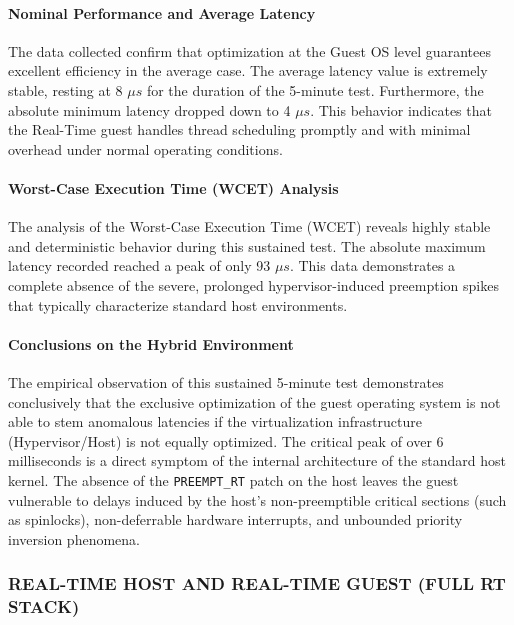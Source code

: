 \paragraph{Nominal Performance and Average
Latency}\label{nominal-performance-and-average-latency-1}

The data collected confirm that optimization at the Guest OS level
guarantees excellent efficiency in the average case. The average latency
value is extremely stable, resting at 8 $\mu s$ for the duration of the
5-minute test. Furthermore, the absolute minimum latency dropped down to
4 $\mu s$. This behavior indicates that the Real-Time guest handles thread
scheduling promptly and with minimal overhead under normal operating
conditions.

\paragraph{Worst-Case Execution Time (WCET)
Analysis}\label{worst-case-execution-time-wcet-analysis-1}

The analysis of the Worst-Case Execution Time (WCET) reveals highly
stable and deterministic behavior during this sustained test. The
absolute maximum latency recorded reached a peak of only 93 $\mu s$. This
data demonstrates a complete absence of the severe, prolonged
hypervisor-induced preemption spikes that typically characterize
standard host environments.

\paragraph{Conclusions on the Hybrid
Environment}\label{conclusions-on-the-hybrid-environment-1}

The empirical observation of this sustained 5-minute test demonstrates
conclusively that the exclusive optimization of the guest operating
system is not able to stem anomalous latencies if the virtualization
infrastructure (Hypervisor/Host) is not equally optimized. The critical
peak of over 6 milliseconds is a direct symptom of the internal
architecture of the standard host kernel. The absence of the
\texttt{PREEMPT\_RT} patch on the host leaves the guest vulnerable to
delays induced by the host's non-preemptible critical sections (such as
spinlocks), non-deferrable hardware interrupts, and unbounded priority
inversion phenomena.

\subsubsection{REAL-TIME HOST AND REAL-TIME GUEST (FULL RT
STACK)}\label{real-time-host-and-real-time-guest-full-rt-stack}

